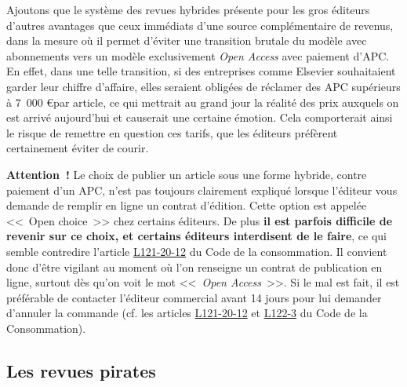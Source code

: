 Ajoutons que le syst{\`e}me des revues hybrides pr{\'e}sente pour les gros {\'e}diteurs d'autres avantages que ceux imm{\'e}diats d'une source compl{\'e}mentaire de revenus,
dans la mesure o{\`u} il permet d'{\'e}viter une transition brutale du mod{\`e}le avec abonnements vers un mod{\`e}le exclusivement \emph{Open Access} avec paiement d'APC.
En effet, dans une telle transition, si des entreprises comme Elsevier souhaitaient garder leur chiffre d'affaire, elles seraient oblig{\'e}es de r{\'e}clamer des
APC sup{\'e}rieurs {\`a} 7~000 \euro par article, ce qui mettrait au grand jour la r{\'e}alit{\'e}
des prix auxquels on est arriv{\'e} aujourd'hui et causerait une certaine {\'e}motion. Cela comporterait ainsi
le risque de remettre en question ces tarifs, que les {\'e}diteurs pr{\'e}f{\`e}rent certainement {\'e}viter de courir. 

\textbf{Attention~!} Le choix de publier un article sous une forme hybride, contre paiement d'un APC, n'est pas toujours clairement expliqu{\'e} lorsque l'{\'e}diteur
vous demande de remplir en ligne un contrat d'{\'e}dition. Cette option est appel{\'e}e <<~Open choice~>> chez certains {\'e}diteurs. 
De plus \textbf{il est parfois difficile de revenir sur ce choix, et certains {\'e}diteurs interdisent
de le faire}, ce qui semble contredire l'article
\href{https://www.legifrance.gouv.fr/affichCodeArticle.do?cidTexte=LEGITEXT000006069565&idArticle=LEGIARTI000006292075&dateTexte=&categorieLien=cid}{L121-20-12}
du Code de la consommation. 
Il convient donc d'{\^e}tre vigilant au moment o{\`u} l'on renseigne un contrat de
publication en ligne, surtout d{\`e}s qu'on voit le mot <<~\emph{Open Access}~>>.
Si le mal est fait, il est pr{\'e}f{\'e}rable de contacter l'{\'e}diteur commercial avant 14 jours pour lui demander d'annuler la commande
(cf. les articles
\href{https://www.legifrance.gouv.fr/affichCodeArticle.do?cidTexte=LEGITEXT000006069565&idArticle=LEGIARTI000006292075&dateTexte=&categorieLien=cid}{L121-20-12}
et \href{https://www.legifrance.gouv.fr/affichCodeArticle.do?cidTexte=LEGITEXT000006069565&idArticle=LEGIARTI000024039758}{L122-3}
du Code de la Consommation).

\subsection{Les revues pirates}

